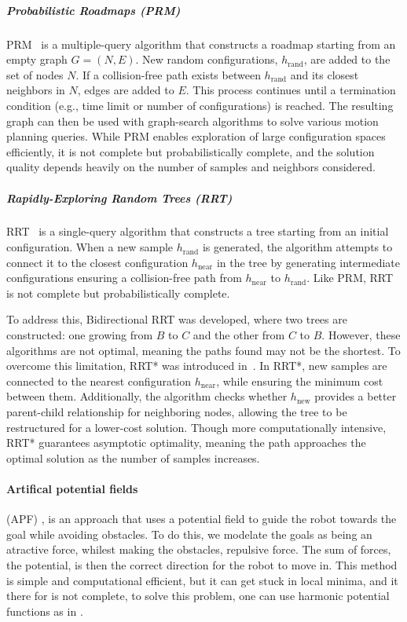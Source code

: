 \subparagraph{Probabilistic Roadmaps (PRM)} 

PRM~\cite{PRM508439} is a multiple-query algorithm that constructs a roadmap starting from an empty graph $G = (N, E)$. New random configurations, $h_{\text{rand}}$, are added to the set of nodes $N$. If a collision-free path exists between $h_{\text{rand}}$ and its closest neighbors in $N$, edges are added to $E$. This process continues until a termination condition (e.g., time limit or number of configurations) is reached. The resulting graph can then be used with graph-search algorithms to solve various motion planning queries. While PRM enables exploration of large configuration spaces efficiently, it is not complete but probabilistically complete, and the solution quality depends heavily on the number of samples and neighbors considered.

\subparagraph{Rapidly-Exploring Random Trees (RRT)} 

RRT~\cite{lavalle2006planning} is a single-query algorithm that constructs a tree starting from an initial configuration. When a new sample $h_{\text{rand}}$ is generated, the algorithm attempts to connect it to the closest configuration $h_{\text{near}}$ in the tree by generating intermediate configurations ensuring a collision-free path from $h_{\text{near}}$ to $h_{\text{rand}}$. Like PRM, RRT is not complete but probabilistically complete. 

To address this, Bidirectional RRT was developed, where two trees are constructed: one growing from $B$ to $C$ and the other from $C$ to $B$. However, these algorithms are not optimal, meaning the paths found may not be the shortest. To overcome this limitation, RRT* was introduced in~\cite{karaman2011sampling}. In RRT*, new samples are connected to the nearest configuration $h_{\text{near}}$, while ensuring the minimum cost between them. Additionally, the algorithm checks whether $h_{\text{new}}$ provides a better parent-child relationship for neighboring nodes, allowing the tree to be restructured for a lower-cost solution. Though more computationally intensive, RRT* guarantees asymptotic optimality, meaning the path approaches the optimal solution as the number of samples increases.

\paragraph{Artifical potential fields} (APF) \cite{khatib1985real}, is an approach that uses a potential field to guide the robot towards the goal while avoiding obstacles. To do this, we modelate the goals as being an atractive force, whilest making the obstacles, repulsive force. The sum of forces, the potential, is then the correct direction for the robot to move in. This method is simple and computational efficient, but it can get stuck in local minima, and it there for is not complete, to solve this problem, one can use harmonic potential functions as in \cite{kim1992real,rimon1990exact}.




